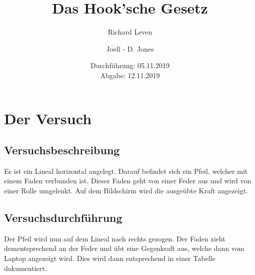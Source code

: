 \documentclass{scrartcl}
\title{Das Hook'sche Gesetz}
\author{Richard Leven \and Joell - D. Jones}
\date{
    Durchführung: 05.11.2019\\
    Abgabe: 12.11.2019
}
\begin{document}
\maketitle
\section{Der Versuch}
\subsection{Versuchsbeschreibung}

Es ist ein Lineal horizontal angelegt. Darauf befindet sich ein Pfeil, welcher mit einem Faden verbunden ist. Dieser Faden geht von einer Feder aus und wird von einer Rolle umgelenkt. Auf dem Bildschirm wird die ausgeübte Kraft angezeigt.

\subsection{Versuchsdurchführung}

Der Pfeil wird nun auf dem Lineal nach rechts gezogen. Der Faden zieht dementsprechend an der Feder und übt eine Gegenkraft aus, welche dann vom Laptop angezeigt wird. Dies wird dann entsprechend in einer Tabelle dokumentiert.

\end{document}
